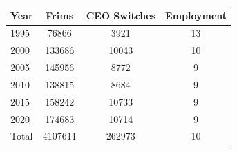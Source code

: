 \begin{tabular}{l*{3}{c}}
\hline\hline
Year & Frims & CEO Switches & Employment \\
\hline
1995  & 76866 & 3921 & 13 \\
2000  & 133686 & 10043 & 10 \\
2005  & 145956 & 8772 & 9 \\
2010  & 138815 & 8684 & 9 \\
2015  & 158242 & 10733 & 9 \\
2020  & 174683 & 10714 & 9 \\
Total  & 4107611 & 262973 & 10 \\
\hline\hline
\end{tabular}
